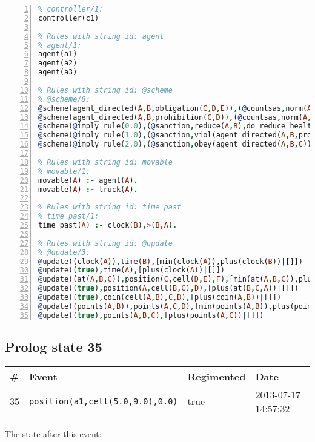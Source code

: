 \documentclass[11pt]{article}\usepackage[utf8]{inputenc}\usepackage{geometry}
\begin{document}
\begin{lstlisting}[language=Prolog, numbers=left]
% Rules with string id: controller
% controller/1:
controller(c1)

% Rules with string id: agent
% agent/1:
agent(a1)
agent(a2)
agent(a3)

% Rules with string id: @scheme
% @scheme/8:
@scheme(agent_directed(A,B,obligation(C,D,E)),(@countsas,norm(A,B,F,obligation(C,D,E)),F),false,(listTrue(C)),(time_past(D)),false,[plus(viol(agent_directed(A,B,obligation(C,D,E))))|[]],[plus(obey(agent_directed(A,B,obligation(C,D,E))))|[]])
@scheme(agent_directed(A,B,prohibition(C,D)),(@countsas,norm(A,B,E,prohibition(C,D)),E),(listTrue(C)),false,(false),false,[plus(viol(agent_directed(A,B,prohibition(C,D))))|[]],[plus(obey(agent_directed(A,B,prohibition(C,D))))|[]])
@scheme(@imply_rule(0.0),(@sanction,reduce(A,B),do_reduce_health(A,B),notifyAgent(A,changed(status))),true,false,false,false,[min(reduce(A,B))|[]],[])
@scheme(@imply_rule(1.0),(@sanction,viol(agent_directed(A,B,prohibition(C,D))),do_sanction(D)),true,false,false,false,[min(viol(agent_directed(A,B,prohibition(C,D))))|[]],[])
@scheme(@imply_rule(2.0),(@sanction,obey(agent_directed(A,B,C))),true,false,false,false,[min(obey(agent_directed(A,B,C)))|[]],[])

% Rules with string id: movable
% movable/1:
movable(A) :- agent(A).
movable(A) :- truck(A).

% Rules with string id: time_past
% time_past/1:
time_past(A) :- clock(B),>(B,A).

% Rules with string id: @update
% @update/3:
@update((clock(A)),time(B),[min(clock(A)),plus(clock(B))|[]])
@update((true),time(A),[plus(clock(A))|[]])
@update((at(A,B,C)),position(C,cell(D,E),F),[min(at(A,B,C)),plus(at(D,E,C))|[]])
@update((true),position(A,cell(B,C),D),[plus(at(B,C,A))|[]])
@update((true),coin(cell(A,B),C,D),[plus(coin(A,B))|[]])
@update((points(A,B)),points(A,C,D),[min(points(A,B)),plus(points(A,D))|[]])
@update((true),points(A,B,C),[plus(points(A,C))|[]])

\end{lstlisting}
\clearpage 
\subsection{Prolog state 35}
\begin{table}[ht]
\centering 
\begin{tabular}{l l l l} 
\textbf{\#} & \textbf{Event} & \textbf{Regimented} & \textbf{Date} \\ [0.5ex] 
\hline
35&\texttt{position(a1,cell(5.0,9.0),0.0)}&true&2013-07-17 14:57:32\\ [1ex] \hline\end{tabular}
\end{table}
The state after this event:
\end{document}
